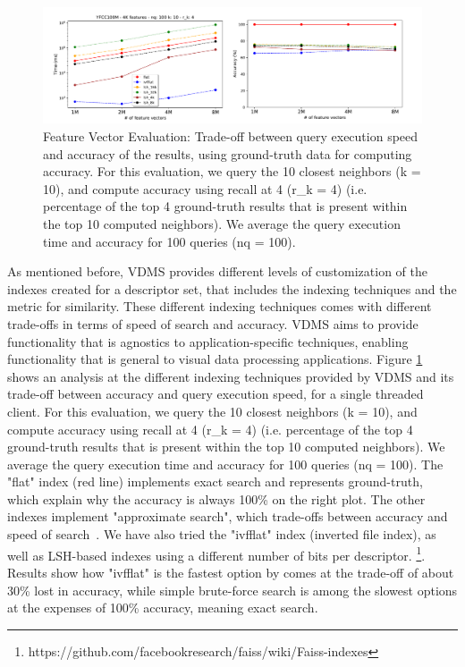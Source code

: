 \begin{figure}[]
\centering
\includegraphics[width=\textwidth]{figures/features_alternatives}
\caption{Feature Vector Evaluation: Trade-off between query execution speed
and accuracy of the results, using ground-truth data for computing accuracy.
For this evaluation, we query the 10 closest neighbors (k = 10), and compute
accuracy using recall at 4 (r\_k = 4) (i.e. percentage of the top 4 ground-truth
results that is present within the top 10 computed neighbors).
We average the query execution time and accuracy for 100 queries (nq = 100).}
\label{fig:features_eval}
\end{figure}

As mentioned before, VDMS provides different levels of customization of the
indexes created for a descriptor set, that includes the indexing techniques
and the metric for similarity.
These different indexing techniques comes with different trade-offs in terms
of speed of search and accuracy.
VDMS aims to provide functionality that is agnostics to application-specific
techniques, enabling functionality that is general to visual data processing
applications.
Figure \ref{fig:features_eval} shows an analysis at the different indexing
techniques provided by VDMS and its trade-off between accuracy and query
execution speed, for a single threaded client.
For this evaluation, we query the 10 closest neighbors (k = 10), and compute
accuracy using recall at 4 (r\_k = 4) (i.e. percentage of the top 4 ground-truth
results that is present within the top 10 computed neighbors).
We average the query execution time and accuracy for 100 queries (nq = 100).
The "flat" index (red line) implements exact search and
represents ground-truth, which explain why the accuracy is always 100\% on the
right plot. The other indexes implement "approximate search", which trade-offs
between accuracy and speed of search~\cite{flann, faiss}.
We have also tried the "ivfflat" index (inverted file index), as well as
LSH-based indexes using a different number of bits per descriptor.
\footnote{https://github.com/facebookresearch/faiss/wiki/Faiss-indexes}.
Results show how "ivfflat" is the fastest option by comes at the trade-off
of about 30\% lost in accuracy, while simple brute-force search
is among the slowest options at the expenses of 100\% accuracy,
meaning exact search.

